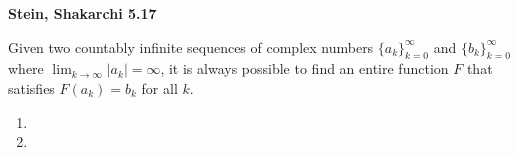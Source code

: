 \textbf{Stein, Shakarchi 5.17}

Given two countably infinite sequences of complex numbers $\{a_k\}_{k=0}^{\infty}$ and $\{b_k\}_{k=0}^{\infty}$ where 
\linebreak $\lim_{k \to \infty} |a_k| = \infty$, it is always possible to find an entire function $F$ that satisfies 
$F(a_k) = b_k$ for all $k$.

\begin{enumerate}
    \item 
    \pagebreak
    \item 
\end{enumerate}